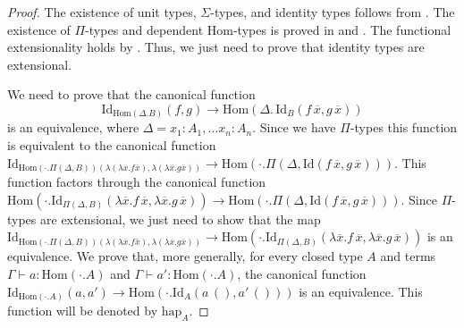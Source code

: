 \documentclass[reqno]{amsart}
\theoremstyle{definition}
\theoremstyle{remark}
\newcommand{\fs}[1]{\mathrm{#1}}
\newcommand{\Hom}{\fs{Hom}}
\newcommand{\Id}{\fs{Id}}
\numberwithin{figure}{section}
\begin{document}
\begin{proof}
The existence of unit types, $\Sigma$-types, and identity types follows from \cite{local-universes}.
The existence of $\Pi$-types and dependent $\Hom$-types is proved in  and .
The functional extensionality holds by \cite[Lemma~5.9]{shul-inv}.
Thus, we just need to prove that identity types are extensional.

We need to prove that the canonical function
\[ \Id_{\Hom(\Delta.B)}(f,g) \to \Hom(\Delta.\,\Id_B(f\,\overline{x},g\,\overline{x})) \] is an equivalence, where $\Delta = x_1 : A_1, \ldots x_n : A_n$.
Since we have $\Pi$-types this function is equivalent to the canonical function $\Id_{\Hom(\cdot . \Pi(\Delta,B))(\lambda(\lambda \overline{x}.f\overline{x}),\lambda(\lambda \overline {x}.g\overline{x}))} \to \Hom(\cdot . \Pi(\Delta, \Id(f\,\overline{x},g\,\overline{x})))$.
This function factors through the canonical function $\Hom(\cdot . \Id_{\Pi(\Delta,B)}(\lambda \overline{x}. f\,\overline{x}, \lambda \overline{x}. g\,\overline{x})) \to \Hom(\cdot . \Pi(\Delta, \Id(f\,\overline{x},g\,\overline{x})))$.
Since $\Pi$-types are extensional, we just need to show that the map $\Id_{\Hom(\cdot . \Pi(\Delta,B))(\lambda(\lambda \overline{x}.f\overline{x}),\lambda(\lambda \overline {x}.g\overline{x}))} \to \Hom(\cdot . \Id_{\Pi(\Delta,B)}(\lambda \overline{x}. f\,\overline{x}, \lambda \overline{x}. g\,\overline{x}))$ is an equivalence.
We prove that, more generally, for every closed type $A$ and terms $\Gamma \vdash a : \Hom(\cdot.A)$ and $\Gamma \vdash a' : \Hom(\cdot.A)$, the canonical function $\Id_{\Hom(\cdot . A)}(a,a') \to \Hom(\cdot . \Id_A(a\,(),a'\,()))$ is an equivalence.
This function will be denoted by $\fs{hap}_A$.


\end{proof}
\end{document}

